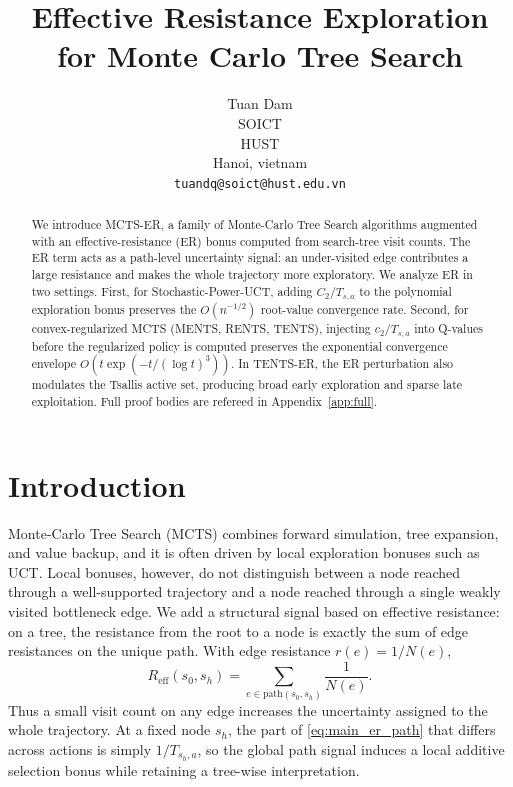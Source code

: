 \documentclass{article}
\title{Effective Resistance Exploration for Monte Carlo Tree Search}
\author{
  Tuan Dam \\
  SOICT\\
  HUST\\
  Hanoi, vietnam \\
  \texttt{tuandq@soict@hust.edu.vn}
}
\newcommand{\Reff}{R_{\mathrm{eff}}}
\begin{document}
\maketitle

\begin{abstract}
We introduce MCTS-ER, a family of Monte-Carlo Tree Search algorithms augmented with an effective-resistance (ER) bonus computed from search-tree visit counts.  The ER term acts as a path-level uncertainty signal: an under-visited edge contributes a large resistance and makes the whole trajectory more exploratory.  We analyze ER in two settings.  First, for Stochastic-Power-UCT, adding $C_2/T_{s,a}$ to the polynomial exploration bonus preserves the $O(n^{-1/2})$ root-value convergence rate.  Second, for convex-regularized MCTS (MENTS, RENTS, TENTS), injecting $c_2/T_{s,a}$ into Q-values before the regularized policy is computed preserves the exponential convergence envelope $O(t\exp(-t/(\log t)^3))$.  In TENTS-ER, the ER perturbation also modulates the Tsallis active set, producing broad early exploration and sparse late exploitation.  Full proof bodies are refereed in Appendix~\ref{app:full}.
\end{abstract}

\section{Introduction}
\label{sec:main_intro}
Monte-Carlo Tree Search (MCTS) combines forward simulation, tree expansion, and value backup, and it is often driven by local exploration bonuses such as UCT.  Local bonuses, however, do not distinguish between a node reached through a well-supported trajectory and a node reached through a single weakly visited bottleneck edge.  We add a structural signal based on effective resistance: on a tree, the resistance from the root to a node is exactly the sum of edge resistances on the unique path.  With edge resistance $r(e)=1/N(e)$,
\begin{equation}
\Reff(s_0,s_h)=\sum_{e\in\mathrm{path}(s_0,s_h)}\frac{1}{N(e)}.
\label{eq:main_er_path}
\end{equation}
Thus a small visit count on any edge increases the uncertainty assigned to the whole trajectory.  At a fixed node $s_h$, the part of \eqref{eq:main_er_path} that differs across actions is simply $1/T_{s_h,a}$, so the global path signal induces a local additive selection bonus while retaining a tree-wise interpretation.
\end{document}
